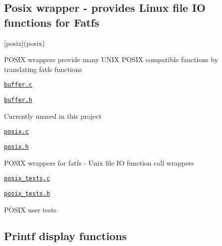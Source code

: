 \subsection*{Posix wrapper -\/ provides Linux file IO functions for Fatfs}


\begin{DoxyItemize}
\item \mbox{[}posix\mbox{]}(posix)
\begin{DoxyItemize}
\item P\+O\+S\+IX wrappers provide many U\+N\+IX P\+O\+S\+IX compatible functions by translating fatfs functions
\item \href{buffer.c}{\tt buffer.\+c}
\item \href{buffer.h}{\tt buffer.\+h}
\begin{DoxyItemize}
\item Currently unused in this project
\end{DoxyItemize}
\item \href{posix/posix.c}{\tt posix.\+c}
\item \href{posix/posix.h}{\tt posix.\+h}
\begin{DoxyItemize}
\item P\+O\+S\+IX wrappers for fatfs -\/ Unix file IO function call wrappers
\end{DoxyItemize}
\item \href{posix/posix_tests.c}{\tt posix\+\_\+tests.\+c}
\item \href{posix/posix_tests.h}{\tt posix\+\_\+tests.\+h}
\begin{DoxyItemize}
\item P\+O\+S\+IX user tests
\end{DoxyItemize}
\end{DoxyItemize}
\end{DoxyItemize}

\subsection*{Printf display functions}



